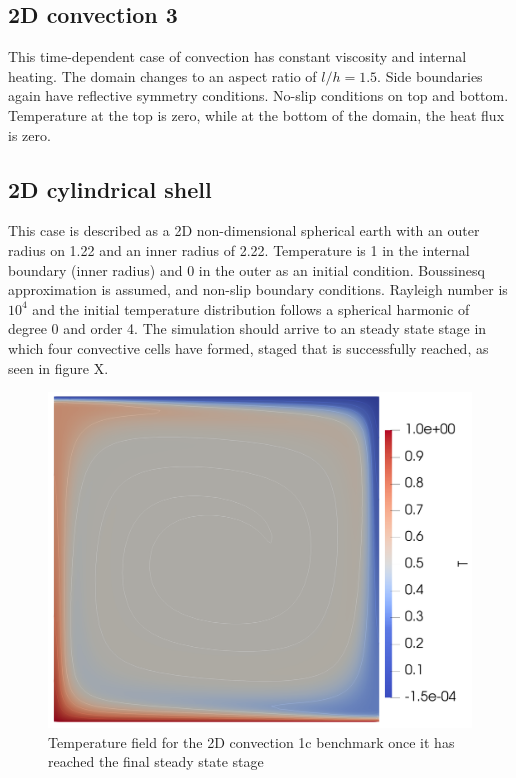 \subsection{2D convection 3}
This time-dependent case of convection has constant viscosity and internal heating. The domain changes to an aspect ratio of $l/h = 1.5$. Side boundaries again have reflective symmetry conditions. No-slip conditions on top and bottom. Temperature at the top is zero, while at the bottom of the domain, the heat flux is zero.


\subsection{2D cylindrical shell}
This case is described as a 2D non-dimensional spherical earth with an outer radius on 1.22 and an inner radius of 2.22. Temperature is 1 in the internal boundary (inner radius) and 0 in the outer as an initial condition. Boussinesq approximation is assumed, and non-slip boundary conditions. Rayleigh number is $10^4$ and the initial temperature distribution follows a spherical harmonic of degree 0 and order 4.
The simulation should arrive to an steady state stage in which four convective cells have formed, staged that is successfully reached, as seen in figure X.

\begin{figure}
    \centering
    \includegraphics[width=0.75\linewidth]{img/chapter2/benchmarks/contours.png}
    \caption{Temperature field for the 2D convection 1c benchmark once it has reached the final steady state stage}
    \label{fig:enter-label}
\end{figure}


